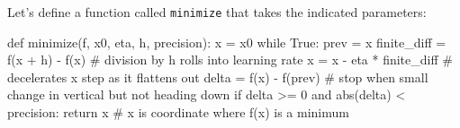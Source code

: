 \documentclass[titlepage]{tufte-book}
\begin{document}
\begin{fullwidth}
\noindent {}

\noindent Let's define a function called {\tt minimize} that takes the indicated parameters:

\begin{pyverbatim}
def minimize(f, x0, eta, h, precision):
    x = x0
    while True:
        prev = x
        finite_diff = f(x + h) - f(x)	 # division by h rolls into learning rate
        x = x - eta * finite_diff 		# decelerates x step as it flattens out
        delta = f(x) - f(prev)
        # stop when small change in vertical but not heading down
        if delta >= 0 and abs(delta) < precision:
            return x   # x is coordinate where f(x) is a minimum
\end{pyverbatim}


\end{fullwidth}
\end{document}
